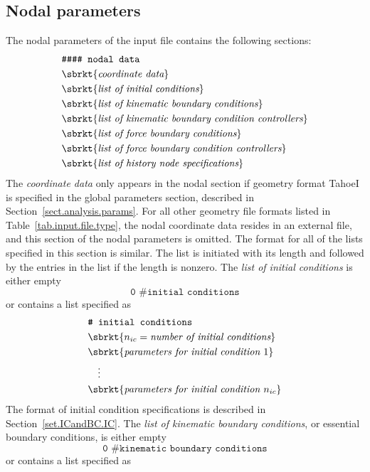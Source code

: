 \subsection{Nodal parameters}
The nodal parameters of the input file contains the 
following sections:
\begin{align}
& \texttt{\#\#\#\# nodal data} \notag \\
& \sbrkt{\textit{coordinate data}} \notag \\
& \sbrkt{\textit{list of initial conditions}} \notag \\
& \sbrkt{\textit{list of kinematic boundary conditions}} \notag \\
& \sbrkt{\textit{list of kinematic boundary condition controllers}} \notag \\
& \sbrkt{\textit{list of force boundary conditions}} \notag \\
& \sbrkt{\textit{list of force boundary condition controllers}} \notag \\
& \sbrkt{\textit{list of history node specifications}} \notag
\end{align}
The \textit{coordinate data} only appears in the nodal section if
geometry format TahoeI is specified in the global parameters 
section, described in Section~\ref{sect.analysis.params}. For all 
other geometry file formats listed in 
Table~\ref{tab.input.file.type}, the nodal coordinate data resides in 
an external file, and this section of the nodal parameters is omitted.
The format for all of the lists specified in this section is similar. 
The list is initiated with its length and followed by the entries in 
the list if the length is nonzero.
The \textit{list of initial conditions} is either empty
\[ \texttt{0 \# initial conditions}\]	
or contains a list specified as
\begin{align}
& \texttt{\# initial conditions} \notag \\
& \sbrkt{n_{ic} = \textit{number of initial conditions}} \notag \\
& \sbrkt{\textit{parameters for initial condition~} 1} \notag \\
& \quad \vdots \notag \\
& \sbrkt{\textit{parameters for initial condition~} n_{ic}} \notag
\end{align}
The format of initial condition specifications is described in
Section~\ref{set.ICandBC.IC}.
The \textit{list of kinematic boundary conditions}, or essential 
boundary conditions, is either empty
\[ \texttt{0 \# kinematic boundary conditions}\]	
or contains a list specified as
